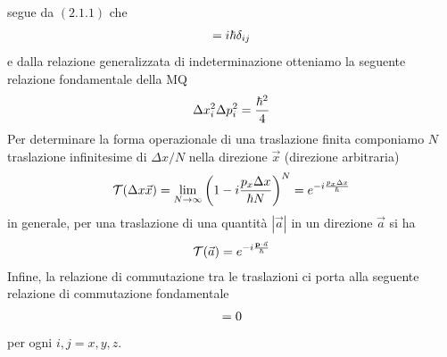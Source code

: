 \documentclass{article}
\begin{document}
segue da $(2.1.1)$ che
\begin{gather}
    [x_i, p_j] = i\hbar\delta_{ij} \notag
\end{gather}
e dalla relazione generalizzata di indeterminazione otteniamo la seguente relazione fondamentale della MQ
\begin{gather}
    \Delta x_i^2 \Delta p_i^2 = \frac{\hbar^2}{4} \notag
\end{gather}
Per determinare la forma operazionale di una traslazione finita componiamo $N$ traslazione infinitesime di $\Delta x/N$ nella direzione $\vec{x}$ (direzione arbitraria)
\begin{gather}
    \mathcal{T}(\Delta x\vec{x}) = \lim_{N \rightarrow \infty} \left( 1 - i\frac{p_x\Delta x}{\hbar N} \right)^N = e^{-i\frac{p_x\Delta x}{\hbar}} \notag 
\end{gather}
in generale, per una traslazione di una quantità $|\vec{a}|$ in un direzione $\vec{a}$ si ha
\begin{gather}
    \mathcal{T}(\vec{a}) = e^{-i\frac{\mathbf{p}\cdot \vec{a}}{\hbar}} \notag
\end{gather}
Infine, la relazione di commutazione tra le traslazioni ci porta alla seguente relazione di commutazione fondamentale
\begin{align}
    [p_i, p_j] = 0 \notag
\end{align}
per ogni $i, j = x, y, z$.
\end{document}
